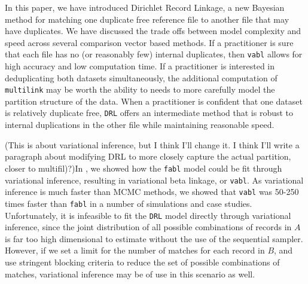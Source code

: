 \documentclass[12pt,letterpaper]{article}
\newcommand{\1}[1]{\mathbb{I}\!\left[#1\right]} %
\def \brian#1{{\color{red} (#1)}}
\begin{document}
In this paper, we have introduced Dirichlet Record Linkage, a new Bayesian method for matching one duplicate free reference file to another file that may have duplicates. We have discussed the trade offs between model complexity and speed across several comparison vector based methods. If a practitioner is sure that each file has no (or reasonably few) internal duplicates, then \texttt{vabl} allows for high accuracy and low computation time. If a practitioner is interested in deduplicating both datasets simultaneously, the additional computation of \texttt{multilink} may be worth the ability to needs to more carefully model the partition structure of the data. When a practitioner is confident that one dataset is relatively duplicate free, \texttt{DRL} offers an intermediate method that is robust to internal duplications in the other file while maintaining reasonable speed. 




\brian{This is about variational inference, but I think I'll change it. I think I'll write a paragraph about modifying DRL to more closely capture the actual partition, closer to multifil)?}In \cite{kundinger_2024_vabl}, we showed how the \texttt{fabl} model could be fit through variational inference, resulting in variational beta linkage, or \texttt{vabl}. As variational inference is much faster than MCMC methods, we showed that \texttt{vabl} was 50-250 times faster than \texttt{fabl} in a number of simulations and case studies. Unfortunately, it is infeasible to fit the \texttt{DRL} model directly through variational inference, since the joint distribution of all possible combinations of records in $A$ is far too high dimensional to estimate without the use of the sequential sampler. However, if we set a limit for the number of matches for each record in $B$, and use stringent blocking criteria to reduce the set of possible combinations of matches, variational inference may be of use in this scenario as well. 
\end{document}
